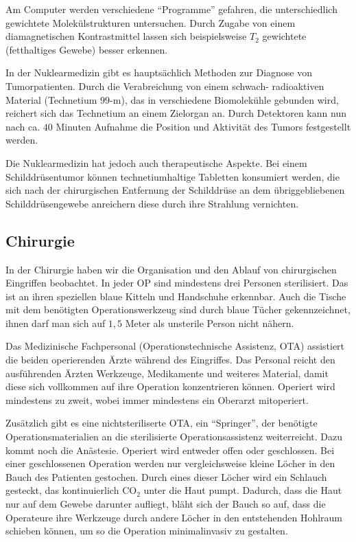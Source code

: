 \documentclass[11pt,a4paper,titlepage]{scrartcl}
\begin{document}
Am Computer werden verschiedene \enquote{Programme} gefahren, die unterschiedlich gewichtete Molekülstrukturen untersuchen. Durch Zugabe von einem diamagnetischen Kontrastmittel lassen sich beispielsweise $T_2$ gewichtete (fetthaltiges Gewebe) besser erkennen. \medskip

In der Nuklearmedizin gibt es hauptsächlich Methoden zur Diagnose von Tumorpatienten. Durch die Verabreichung von einem schwach- radioaktiven Material (Technetium $99$-m), das in verschiedene Biomolekühle gebunden wird, reichert sich das Technetium an einem Zielorgan an. Durch Detektoren kann nun nach ca. $40$ Minuten Aufnahme die Position und Aktivität des Tumors festgestellt werden. \medskip

Die Nuklearmedizin hat jedoch auch therapeutische Aspekte. Bei einem Schilddrüsentumor können technetiumhaltige Tabletten konsumiert werden, die sich nach der chirurgischen Entfernung der Schilddrüse an dem übriggebliebenen Schilddrüsengewebe anreichern diese durch ihre Strahlung vernichten. \medskip






\subsection{Chirurgie}

In der Chirurgie haben wir die Organisation und den Ablauf von chirurgischen Eingriffen beobachtet. In jeder OP sind mindestens drei Personen sterilisiert. Das ist an ihren speziellen blaue Kitteln und Handschuhe erkennbar. Auch die Tische mit dem benötigten Operationswerkzeug sind durch blaue Tücher gekennzeichnet, ihnen darf man sich auf $1,5$ Meter als unsterile Person nicht nähern. \medskip

Das Medizinische Fachpersonal (Operationstechnische Assistenz, OTA) assistiert die beiden operierenden Ärzte während des Eingriffes. Das Personal reicht den ausführenden Ärzten Werkzeuge, Medikamente und weiteres Material, damit diese sich vollkommen auf ihre Operation konzentrieren können. Operiert wird mindestens zu zweit, wobei immer mindestens ein Oberarzt mitoperiert. \medskip

Zusätzlich gibt es eine nichtsteriliserte OTA, ein \enquote{Springer}, der benötigte Operationsmaterialien an die sterilisierte Operationsassistenz weiterreicht. Dazu kommt noch die Anästesie. \medskip
Operiert wird entweder offen oder geschlossen. Bei einer geschlossenen Operation werden nur vergleichsweise kleine Löcher in den Bauch des Patienten gestochen. Durch eines dieser Löcher wird ein Schlauch gesteckt, das kontinuierlich CO$_2$ unter die Haut pumpt. Dadurch, dass die Haut nur auf dem Gewebe darunter aufliegt, bläht sich der Bauch so auf, dass die Operateure ihre Werkzeuge durch andere Löcher in den entstehenden Hohlraum schieben können, um so die Operation minimalinvasiv zu gestalten. \medskip
\end{document}

